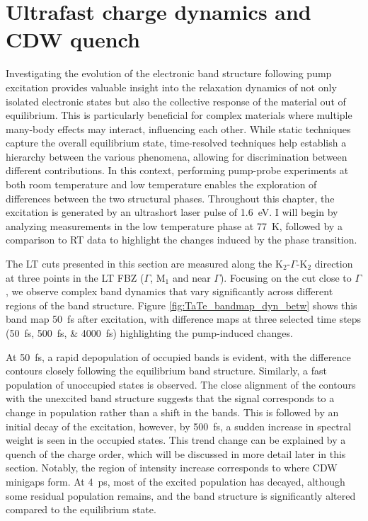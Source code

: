 \section{Ultrafast charge dynamics and CDW quench}
\label{sec:tate_dynamics}

Investigating the evolution of the electronic band structure following pump excitation provides valuable insight into the relaxation dynamics of not only isolated electronic states but also the collective response of the material out of equilibrium.
This is particularly beneficial for complex materials where multiple many-body effects may interact, influencing each other.
While static techniques capture the overall equilibrium state, time-resolved techniques help establish a hierarchy between the various phenomena, allowing for discrimination between different contributions.
In this context, performing pump-probe experiments at both room temperature and low temperature enables the exploration of differences between the two structural phases.
Throughout this chapter, the excitation is generated by an ultrashort laser pulse of \qty{1.6}{\electronvolt}.
I will begin by analyzing measurements in the low temperature phase at \qty{77}{\kelvin}, followed by a comparison to RT data to highlight the changes induced by the phase transition.

The LT cuts presented in this section are measured along the K$_2$-$\Gamma$-K$_2$ direction at three points in the LT FBZ ($\Gamma$, M$_1$ and near $\Gamma$).
Focusing on the cut close to $\Gamma$, we observe complex band dynamics that vary significantly across different regions of the band structure.
Figure \ref{fig:TaTe_bandmap_dyn_betw} shows this band map \qty{50}{\femto\second} after excitation, with difference maps at three selected time steps (\qtylist{50; 500; 4000}{\femto\second}) highlighting the pump-induced changes.

At \qty{50}{\femto\second}, a rapid depopulation of occupied bands is evident, with the difference contours closely following the equilibrium band structure.
Similarly, a fast population of unoccupied states is observed.
The close alignment of the contours with the unexcited band structure suggests that the signal corresponds to a change in population rather than a shift in the bands.
This is followed by an initial decay of the excitation, however, by \qty{500}{\femto\second}, a sudden increase in spectral weight is seen in the occupied states.
This trend change can be explained by a quench of the charge order, which will be discussed in more detail later in this section.
Notably, the region of intensity increase corresponds to where CDW minigaps form.
At \qty{4}{\pico\second}, most of the excited population has decayed, although some residual population remains, and the band structure is significantly altered compared to the equilibrium state.

